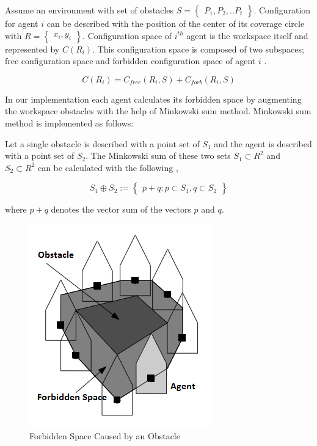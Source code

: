 Assume an environment with set of obstacles $S = \begin{Bmatrix}
P_1, P_2, .. P_t \end{Bmatrix}$. Configuration for agent $i$ can be described with the position of the center of its coverage circle with $R=\begin{Bmatrix}x_i, y_i\end{Bmatrix}$. Configuration space of $i^{th}$ agent is the workspace itself and represented by $C(R_i)$. This configuration space is composed of two subspaces; free configuration space and forbidden configuration space of agent $i$ \cite{92}.

\begin{equation}
C(R_i) = C_{free}(R_i,S) + C_{forb}(R_i,S)
\end{equation}

In our implementation each agent calculates its forbidden space by augmenting the workspace obstacles with the help of Minkowski sum method. Minkowski sum method is implemented as follows:

Let a single obstacle is described with a point set of $S_1$ and the agent is described with a point set of $S_2$. The Minkowski sum of these two sets $S_1 \subset R^2$ and $S_2 \subset R^2$ can be calculated with the following \cite{92},
	
\begin{equation}
S_1 \oplus S_2 := \begin{Bmatrix}
p+q : p \subset S_1, q \subset S_2
\end{Bmatrix} 
\end{equation}

where $p+q$ denotes the vector sum of the vectors $p$ and $q$.
		
\begin{figure}[H]
\caption{Forbidden Space Caused by an Obstacle \cite{92}} \label{yasakli_bolge}
\centering
\includegraphics[scale = 0.75]{Forbidden}
\end{figure}
	
